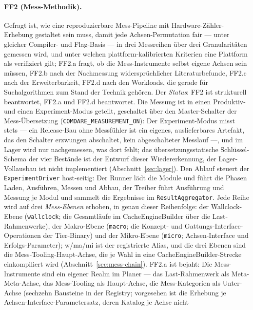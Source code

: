 \begin{nurlang}
\paragraph{FF2 (Mess-Methodik).} Gefragt ist, wie eine reproduzierbare Mess-Pipeline mit
Hardware-Zähler-Erhebung gestaltet sein muss, damit jede Achsen-Permutation fair --- unter gleicher
Compiler- und Flag-Basis --- in drei Messreihen über drei Granularitäten gemessen wird, und unter welchen
plattform-kalibrierten Kriterien eine Plattform als verifiziert gilt; FF2.a fragt, ob die
Mess-Instrumente selbst eigene Achsen sein müssen, FF2.b nach der Nachmessung widersprüchlicher
Literaturbefunde, FF2.c nach der Erweiterbarkeit, FF2.d nach den Workloads, die gerade für
Suchalgorithmen zum Stand der Technik gehören. Der \emph{Status}: FF2 ist strukturell beantwortet,
FF2.a und FF2.d beantwortet. Die Messung ist in
einen Produktiv- und einen Experiment-Modus geteilt, geschaltet über den Master-Schalter der
Mess-Übersetzung (\texttt{COMDARE\_\allowbreak{}MEASUREMENT\_\allowbreak{}ON}): Der Experiment-Modus
misst stets --- ein Release-Bau ohne Messfühler ist ein eigenes, auslieferbares Artefakt, das den
Schalter erzwungen abschaltet, kein abgeschalteter Messlauf ---, und im Lager wird nur nachgemessen, was
dort fehlt; das übersetzungsstatische Schlüssel-Schema der vier Bestände ist der Entwurf dieser
Wiedererkennung, der Lager-Vollausbau ist nicht implementiert (Abschnitt~\ref{sec:lager}). Den
Ablauf steuert der \texttt{ExperimentDriver} host-seitig: Der Runner lädt die Module und führt die Phasen
Laden, Ausführen, Messen und Abbau, der Treiber führt Ausführung und Messung je Modul und sammelt die
Ergebnisse im \texttt{ResultAggregator}. Jede Reihe wird auf drei \emph{Mess-Ebenen} erhoben, in genau
dieser Reihenfolge: der Wallclock-Ebene (\texttt{wallclock}; die Gesamtläufe im CacheEngineBuilder über
die Last-Rahmenwerke), der Makro-Ebene (\texttt{macro}; die Konzept- und Gattungs-Interface-Operationen
der Tier-Binary) und der Mikro-Ebene (\texttt{micro}; Achsen-Interface und Erfolgs-Parameter); w/ma/mi
ist der registrierte Alias, und die drei Ebenen sind die Mess-Tooling-Haupt-Achse, die je Wahl in eine
CacheEngineBuilder-Strecke einkompiliert wird (Abschnitt~\ref{sec:mess-chain}). FF2.a ist bejaht: Die
Mess-Instrumente sind ein eigener Realm im Planer --- das Last-Rahmenwerk als Meta-Meta-Achse, das
Mess-Tooling als Haupt-Achse, die Mess-Kategorien als Unter-Achse (sechzehn Bausteine in der Registry;
vorgesehen ist die Erhebung je Achsen-Interface-Parametersatz, deren Katalog je Achse nicht

\end{nurlang}
